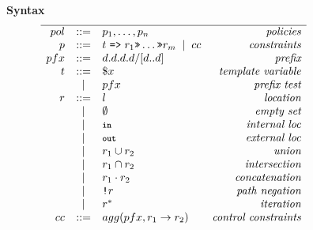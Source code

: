 \documentclass[twocolumn, openany]{sig-alternate-10pt}
\newcommand{\KW}[1]{\texttt{\small\bfseries{#1}}}
\newcommand{\Prefer}{\texttt{>>}}
\newcommand{\Path}{\texttt{=>}}
\newcommand{\In}{\KW{in}}
\newcommand{\Out}{\KW{out}}
\newcommand{\NOT}{\texttt{!}}
\newcommand{\BNFALT}{\;\;|\;\;}
\newcommand{\hdr}[2]{\flushleft \chdr{\hspace{5mm}#1}{#2}}
\newcommand{\chdr}[2]{\textbf{#1} {#2} \\ \centering}%
\begin{document}
\begin{figure*}[h!]\small
  \begin{minipage}[t]{.45\linewidth}
  \hdr{Syntax}{}
  \vspace*{-1\baselineskip}
  \[ \begin{array}{rclr}
    \hline%

     pol     &::=& p_1, \dots, p_n & \textit{policies} \\
     p       &::=& t \hspace{.3em} \Path \hspace{.3em} r_1 \Prefer \dots \Prefer r_m \BNFALT cc & \textit{constraints} \\
     pfx     &::=& d.d.d.d/[d..d] & \textit{prefix} \\
     t       &::=& \$x & \textit{template variable} \\
         &\BNFALT& pfx & \textit{prefix test} \\
     r       &::=& l & \textit{location} \\
         &\BNFALT& \emptyset & \textit{empty set} \\
         &\BNFALT& \In & \textit{internal loc} \\
         &\BNFALT& \Out & \textit{external loc} \\
         &\BNFALT& r_1 \cup r_2 & \textit{union} \\
         &\BNFALT& r_1 \cap r_2 & \textit{intersection} \\
         &\BNFALT& r_1 \cdot r_2 & \textit{concatenation} \\
         &\BNFALT& \NOT r & \textit{path negation} \\
         &\BNFALT& r^* & \textit{iteration} \\
     cc     &::=& agg(pfx, r_1 \rightarrow r_2)  & \textit{control constraints} \\
  \end{array} \]%


\end{minipage}
\end{figure*}
\end{document}
